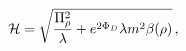 \begin{equation}
\label{hnew}
{\cal H} = \sqrt{ \frac{\Pi_\rho^2}{\lambda}+ e^{2 \Phi_D} \lambda
m^2 \beta(\rho)}\,,
\end{equation}


